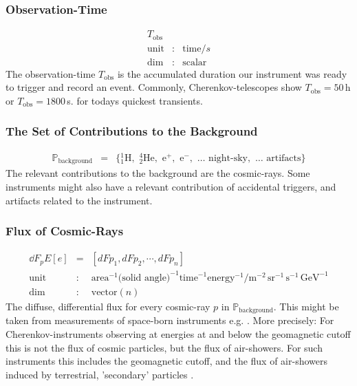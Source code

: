 \documentclass{article}%
\begin{document}
\subsubsection*{Observation-Time}
%
\begin{eqnarray*}
T_\text{obs} && \\
\text{unit} &:& \text{time} / s\\
\text{dim} &:& \text{scalar}
\end{eqnarray*}
%
The observation-time $T_\text{obs}$ is the accumulated duration our instrument was ready to trigger and record an event.
%
Commonly, Cherenkov-telescopes show $T_\text{obs} = 50\,$h or $T_\text{obs} = 1800\,$s. for todays quickest transients.
%
\subsubsection*{The Set of Contributions to the Background}
%
\begin{eqnarray*}
\mathbb{P}_\text{background} &=& \{
{_1^1}\text{H},\,\,
{_2^4}\text{He},\,\,
\text{e}^{+},\,\,
\text{e}^{-},\,\,
\dots{}\,\,
\text{night-sky},\,\,
\dots{}\,\,
\text{artifacts}
\}
\end{eqnarray*}
%
The relevant contributions to the background are the cosmic-rays. Some instruments might also have a relevant contribution of accidental triggers, and artifacts related to the instrument.
%
\subsubsection*{Flux of Cosmic-Rays}
%
\begin{eqnarray*}
\dd{F_p}{E}[e] &=& [dFp_1, dFp_2, \cdots, dFp_n]\\
\text{unit} &:& \text{area}^{-1} \text{(solid angle)}^{-1} \text{time}^{-1} \text{energy}^{-1} / \text{m}^{-2}\, \text{sr}^{-1}\,\text{s}^{-1}\,\text{GeV}^{-1}\\
\text{dim} &:& \text{vector}(n)
\end{eqnarray*}
The diffuse, differential flux for every cosmic-ray $p$ in $\mathbb{P}_\text{background}$. This might be taken from measurements of space-born instruments e.g. \cite{aguilar2014precision,aguilar2015precision}.
%
More precisely: For Cherenkov-instruments observing at energies at and below the geomagnetic cutoff this is not the flux of cosmic particles, but the flux of air-showers.
%
For such instruments this includes the geomagnetic cutoff, and the flux of air-showers induced by terrestrial, 'secondary' particles \cite{lipari2002fluxes}.
%
\end{document}

